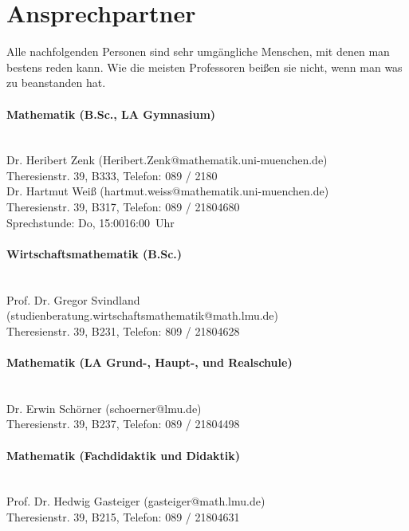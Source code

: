 \section{Ansprechpartner}

Alle nachfolgenden Personen sind sehr umgängliche Menschen, mit denen
man bestens reden kann. Wie die meisten Professoren beißen sie nicht,
wenn man was zu beanstanden hat.

\paragraph{Mathematik (B.Sc., LA Gymnasium)}\hfill\\
Dr. Heribert Zenk (Heribert.Zenk@mathematik.uni-muenchen.de)\\
Theresienstr. 39, B333, Telefon: 089 / 2180\\

Dr. Hartmut Weiß (hartmut.weiss@mathematik.uni-muenchen.de)\\
Theresienstr. 39, B317, Telefon: 089 / 2180\emd{}4680\\
Sprechstunde: Do, 15:00\emd{}16:00~Uhr

\paragraph{Wirtschaftsmathematik (B.Sc.)}\hfill\\
Prof. Dr. Gregor Svindland (studienberatung.wirtschaftsmathematik@math.lmu.de)\\
Theresienstr. 39, B231, Telefon: 809 / 2180\emd{}4628\\

\paragraph{Mathematik (LA Grund-, Haupt-, und Realschule)}\hfill\\
Dr. Erwin Schörner (schoerner@lmu.de)\\
Theresienstr. 39, B237, Telefon: 089 / 2180\emd{}4498\\

\paragraph{Mathematik (Fachdidaktik und Didaktik)}\hfill\\
Prof. Dr. Hedwig Gasteiger (gasteiger@math.lmu.de)\\
Theresienstr. 39, B215, Telefon: 089 / 2180\emd{}4631\\

